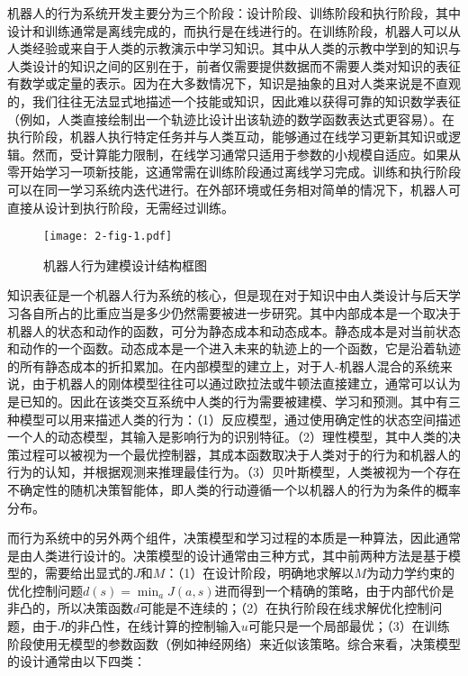 机器人的行为系统开发主要分为三个阶段：设计阶段、训练阶段和执行阶段，其中设计和训练通常是离线完成的，而执行是在线进行的。在训练阶段，机器人可以从人类经验或来自于人类的示教演示中学习知识。其中从人类的示教中学到的知识与人类设计的知识之间的区别在于，前者仅需要提供数据而不需要人类对知识的表征有数学或定量的表示。因为在大多数情况下，知识是抽象的且对人类来说是不直观的，我们往往无法显式地描述一个技能或知识，因此难以获得可靠的知识数学表征（例如，人类直接绘制出一个轨迹比设计出该轨迹的数学函数表达式更容易）。在执行阶段，机器人执行特定任务并与人类互动，能够通过在线学习更新其知识或逻辑。然而，受计算能力限制，在线学习通常只适用于参数的小规模自适应。如果从零开始学习一项新技能，这通常需在训练阶段通过离线学习完成。训练和执行阶段可以在同一学习系统内迭代进行。在外部环境或任务相对简单的情况下，机器人可直接从设计到执行阶段，无需经过训练。

\begin{figure}[h]
    \centering
    \texttt{[image: 2-fig-1.pdf]}
    \caption{机器人行为建模设计结构框图}
    \label{fig:2-1}
\end{figure}
知识表征是一个机器人行为系统的核心，但是现在对于知识中由人类设计与后天学习各自所占的比重应当是多少仍然需要被进一步研究。其中内部成本是一个取决于机器人的状态和动作的函数，可分为静态成本和动态成本。静态成本是对当前状态和动作的一个函数。动态成本是一个进入未来的轨迹上的一个函数，它是沿着轨迹的所有静态成本的折扣累加。在内部模型的建立上，对于人-机器人混合的系统来说，由于机器人的刚体模型往往可以通过欧拉法或牛顿法直接建立，通常可以认为是已知的。因此在该类交互系统中人类的行为需要被建模、学习和预测\cite{liuDesigningRobotBehavior,araiAssessmentOperatorStress2010,xinxuHumanBehaviorUnderstanding2010}。其中有三种模型可以用来描述人类的行为：（1）反应模型，通过使用确定性的状态空间描述一个人的动态模型，其输入是影响行为的识别特征。（2）理性模型，其中人类的决策过程可以被视为一个最优控制器，其成本函数取决于人类对于的行为和机器人的行为的认知，并根据观测来推理最佳行为。（3）贝叶斯模型，人类被视为一个存在不确定性的随机决策智能体，即人类的行动遵循一个以机器人的行为为条件的概率分布。

而行为系统中的另外两个组件，决策模型和学习过程的本质是一种算法，因此通常是由人类进行设计的。决策模型的设计通常由三种方式，其中前两种方法是基于模型的，需要给出显式的$J$和$M$：（1）在设计阶段，明确地求解以$M$为动力学约束的优化控制问题$d(s)=\min_a J(a,s)$进而得到一个精确的策略，由于内部代价是非凸的，所以决策函数$d$可能是不连续的；（2）在执行阶段在线求解优化控制问题，由于$J$的非凸性，在线计算的控制输入$u$可能只是一个局部最优；（3）在训练阶段使用无模型的参数函数（例如神经网络）来近似该策略。综合来看，决策模型的设计通常由以下四类：

